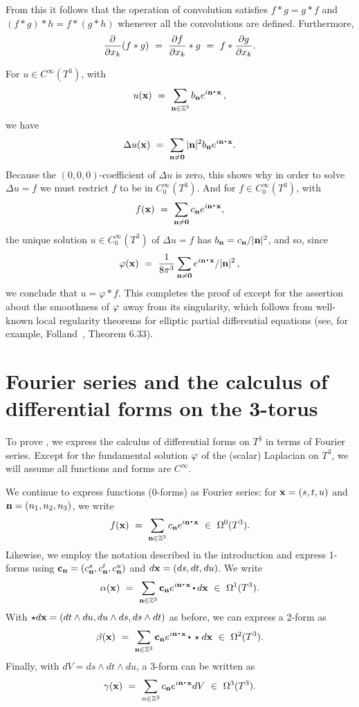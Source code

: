 From this
it follows that the operation of convolution satisfies $f*g=g*f$
and $(f*g)*h=f*(g*h)$ whenever all the convolutions are defined. Furthermore,
$$
{\partial\over \partial x_k}(f*g)\ = \ {\partial f\over \partial x_k}*g \ = \  f*{\partial g\over \partial x_k}.
$$

For $u\in C^\infty(T^3)$, with 
$$
u(\x)\ = \ \sum_{\n\in\ints^3} b_{\n}e^{i\n\dte\x}\,,
$$
we have
$$
\Delta u(\x)\ = \ \sum_{\n\neq\zero}|\n|^2b_{\n}e^{i\n\dte\x}.
$$
Because the $(0,0,0)$-coefficient of $\Delta u$ is zero, this shows why in order to solve $\Delta u=f$ we must restrict $f$ to be in $C^\infty_0(T^3)$.   And for $f\in C^\infty_0(T^3)$, with
$$
f(\x)\ = \ \sum_{\n\neq\zero}c_{\n}e^{i\n\dte\x},
$$
the unique solution $u\in C^\infty_0(T^3)$ of $\Delta u=f$ has $b_{\textup{\bf n}}= c_{\textup{\bf n}}/|\textup{\bf n}|^2$,
and so, since 
$$
\ph(\x)\ = \ \frac{1}{8\pi^3}\sum_{\n\ne\zero}{e^{i\n\dte \x}}/{\|\n\|^2}\,,
$$
we conclude that $u=\varphi * f$.  This completes the proof of  except for the assertion about the smoothness of $\varphi$ away from its singularity, which follows from well-known local regularity theorems for elliptic partial differential equations (see, for example, Folland~\cite{Folland},  Theorem 6.33).

\part{Fourier series and the calculus of differential forms on the 3-torus}

To prove , we express the calculus of differential forms on $T^3$ in terms of Fourier series.  Except for the fundamental solution $\varphi$ of the (scalar) Laplacian on $T^3$, we will assume all functions and forms are $C^\infty$.

We continue to express functions (0-forms) as Fourier series: for 
$\textup{\bf x}=(s,t,u)$ and $\textup{\bf n}=(n_1,n_2,n_3)$, we write
$$
f(\x) \ = \ \sum_{\n\in\ints^3}c_{\n}e^{i\n\dte\x}\ \in\ \Omega^0(T^3).
$$
Likewise, we employ the notation described in the introduction and express 1-forms using 
$\textup{\bf c}_{\textup{\bf n}}=(c_{\textup{\bf n}}^{s},c_{\textup{\bf n}}^{t},c_{\textup{\bf n}}^{u})$
and $d\textup{\bf x}=(ds,dt,du)$. We write
$$
\alpha(\x) \ = \ \sum_{\n\in\ints^3}\c_{\n}e^{i\n\dte\x}\dt d\x\ \in\ \Omega^1(T^3).
$$
With $\star d\textup{\bf x}=(dt\wedge du,du\wedge ds,ds\wedge dt)$ as before, we can express a 2-form as
$$
\beta(\x) \ = \ \sum_{\n\in\ints^3}\c_{\n}e^{i\n\dte\x}\dt \star d\x\ \in\ \Omega^2(T^3).
$$
Finally, with $dV=ds\wedge dt\wedge du$, a 3-form can be written as
$$
\gamma(\x) \ = \ \sum_{n\in\ints^3}c_{\n}e^{i\n\dte\x}dV\ \in\ \Omega^3(T^3).
$$

